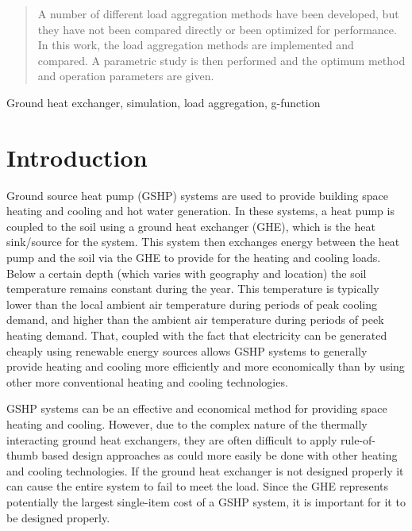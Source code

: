 \documentclass[review,12pt]{elsarticle}
\begin{document}
\begin{frontmatter}
\begin{abstract}
A number of different load aggregation methods have been developed, but they have not been compared directly or been optimized for performance. In this work, the load aggregation methods are implemented and compared. A parametric study is then performed and the optimum method and operation parameters are given.

\end{abstract}

\begin{keyword}
Ground heat exchanger, simulation, load aggregation, g-function
\end{keyword}

\end{frontmatter}

\linenumbers

\section{Introduction}
Ground source heat pump (GSHP) systems are used to provide building space heating and cooling and hot water generation. In these systems, a heat pump is coupled to the soil using a ground heat exchanger (GHE), which is the heat sink/source for the system. This system then exchanges energy between the heat pump and the soil via the GHE to provide for the heating and cooling loads. Below a certain depth (which varies with geography and location) the soil temperature remains constant during the year. This temperature is typically lower than the local ambient air temperature during periods of peak cooling demand, and higher than the ambient air temperature during periods of peek heating demand. That, coupled with the fact that electricity can be generated cheaply using renewable energy sources allows GSHP systems to generally provide heating and cooling more efficiently and more economically than by using other more conventional heating and cooling technologies.

GSHP systems can be an effective and economical method for providing space heating and cooling. However, due to the complex nature of the thermally interacting ground heat exchangers, they are often difficult to apply rule-of-thumb based design approaches as could more easily be done with other heating and cooling technologies. If the ground heat exchanger is not designed properly it can cause the entire system to fail to meet the load. Since the GHE represents potentially the largest single-item cost of a GSHP system, it is important for it to be designed properly.
\end{document}
